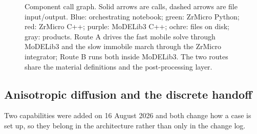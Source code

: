 \documentclass[11pt]{article}
\newcommand{\ZrM}{\textsf{ZrMicro}}
\newcommand{\MoD}{\textsf{MoDELib3}}
\begin{document}
\begin{figure}[htbp]
{}
\caption{Component call graph. Solid arrows are calls, dashed arrows are
file input/output. Blue: orchestrating notebook; green: \ZrM{} Python; red:
\ZrM{} C++; purple: \MoD{} C++; ochre: files on disk; gray: products. Route
A drives the fast mobile solve through \MoD{} and the slow immobile march
through the \ZrM{} integrator; Route B runs both inside \MoD{}. The two
routes share the material definitions and the post-processing layer.}
\label{fig:flow}
\end{figure}

\subsection{Anisotropic diffusion and the discrete handoff}
\label{sec:aniso-handoff}

Two capabilities were added on 16 August 2026 and both change how a case is
set up, so they belong in the architecture rather than only in the change log.
\end{document}
